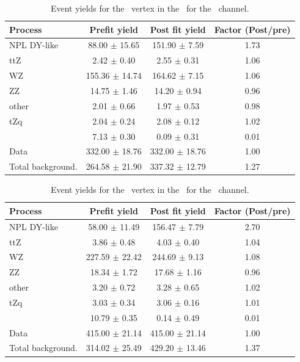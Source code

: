 \newpage
\begin{table}[htbp]
	\centering
	\caption{Event yields for the \Zct\ vertex in the \WZCR\  for the \emumu\ channel. }
	\begin{tabular} {l c c c }
		\toprule
		Process & Prefit yield & Post fit yield & Factor (Post/pre) \\
		\midrule
		NPL DY-like & 88.00 $ \pm $ 15.65 & 151.90 $ \pm $ 7.59 & 1.73 \\ 
		ttZ & 2.42 $ \pm $ 0.40 & 2.55 $ \pm $ 0.31 & 1.06 \\ 
		WZ & 155.36 $ \pm $ 14.74 & 164.62 $ \pm $ 7.15 & 1.06 \\ 
		ZZ & 14.75 $ \pm $ 1.46 & 14.20 $ \pm $ 0.94 & 0.96 \\ 
		other & 2.01 $ \pm $ 0.66 & 1.97 $ \pm $ 0.53 & 0.98 \\ 
		tZq & 2.04 $ \pm $ 0.24 & 2.08 $ \pm $ 0.12 & 1.02 \\ 
		\kZct  & 7.13 $ \pm $ 0.30 & 0.09 $ \pm $ 0.31 & 0.01\\
		\hdashline
		Data & 332.00 $ \pm $ 18.76 & 332.00 $ \pm $ 18.76 & 1.00\\
		Total background. & 264.58 $ \pm $ 21.90 & 337.32 $ \pm $ 12.79 & 1.27\\
		\bottomrule
	\end{tabular}
\end{table}
\begin{table}[htbp]
	\centering
	\caption{Event yields for the \Zct\ vertex in the \WZCR\  for the \mumumu\ channel. }
	\begin{tabular} {l c c c }
		\toprule
		Process & Prefit yield & Post fit yield & Factor (Post/pre) \\
		\midrule
		NPL DY-like & 58.00 $ \pm $ 11.49 & 156.47 $ \pm $ 7.79 & 2.70 \\ 
		ttZ & 3.86 $ \pm $ 0.48 & 4.03 $ \pm $ 0.40 & 1.04 \\ 
		WZ & 227.59 $ \pm $ 22.42 & 244.69 $ \pm $ 9.13 & 1.08 \\ 
		ZZ & 18.34 $ \pm $ 1.72 & 17.68 $ \pm $ 1.16 & 0.96 \\ 
		other & 3.20 $ \pm $ 0.72 & 3.28 $ \pm $ 0.65 & 1.02 \\ 
		tZq & 3.03 $ \pm $ 0.34 & 3.06 $ \pm $ 0.16 & 1.01 \\ 
		\kZct  & 10.79 $ \pm $ 0.35 & 0.14 $ \pm $ 0.49 & 0.01\\
		\hdashline
		Data & 415.00 $ \pm $ 21.14 & 415.00 $ \pm $ 21.14 & 1.00\\
		Total background. & 314.02 $ \pm $ 25.49 & 429.20 $ \pm $ 13.46 & 1.37\\
		\bottomrule
	\end{tabular}
\end{table}


